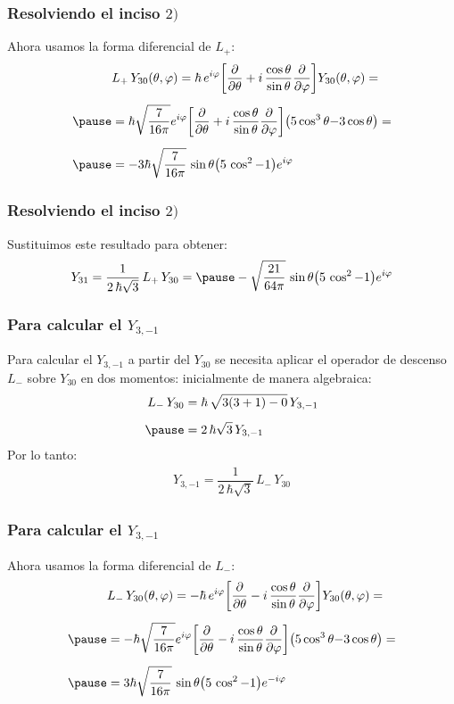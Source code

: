 \documentclass[12pt]{beamer}
\begin{document}
\begin{frame}
\frametitle{Resolviendo el inciso $2)$}
Ahora usamos la forma diferencial de $L_{+}$:
\pause
\begin{eqnarray*}
\begin{aligned}
&L_{+} \, Y_{30} (\theta, \varphi) = \hbar \, e^{i \varphi} \bigg[ \pdv{\theta} + i \, \dfrac{\cos \theta}{\sin \theta} \pdv{\varphi} \bigg] Y_{30} (\theta, \varphi) = \\[0.5em] \pause
&= \hbar \sqrt{\dfrac{7}{16 \pi}} e^{i \varphi} \bigg[ \pdv{\theta} + i \, \dfrac{\cos \theta}{\sin \theta} \pdv{\varphi} \bigg] \big( 5 \cos^{3} \theta {-} 3 \cos \theta \big) = \\[0.5em] \pause 
&= - 3 \hbar \sqrt{\dfrac{7}{16 \pi}} \, \sin \theta \big( 5 \, \cos^{2} - 1 \big) e^{i \varphi}
\end{aligned}
\end{eqnarray*}
\end{frame}
\begin{frame}
\frametitle{Resolviendo el inciso $2)$}
Sustituimos este resultado para obtener:
\pause
\begin{eqnarray*}
Y_{31} = \dfrac{1}{2 \, \hbar \sqrt{3}} \, L_{+} \, Y_{30} = \pause - \sqrt{\dfrac{21}{64 \pi}} \, \sin \theta \big( 5 \, \cos^{2} - 1 \big) e^{i \varphi}
\end{eqnarray*}
\end{frame}
\begin{frame}
\frametitle{Para calcular el $Y_{3,-1}$}
Para calcular el $Y_{3,-1}$ a partir del $Y_{30}$ \pause se necesita aplicar el operador de descenso $L_{-}$ sobre $Y_{30}$ en dos momentos: \pause inicialmente de manera algebraica:
\pause
\begin{eqnarray*}
\begin{aligned}
L_{-} \, Y_{30} &= \hbar \, \sqrt{3 (3 + 1)- 0} \, Y_{3,-1} \\[0.5em] \pause
&= 2 \, \hbar \sqrt{3} \, Y_{3,-1}
\end{aligned}
\end{eqnarray*}
\pause
Por lo tanto:
\pause
\begin{align*}
Y_{3,-1} = \dfrac{1}{2 \, \hbar \sqrt{3}} \, L_{-} \, Y_{30}
\end{align*}
\end{frame}
\begin{frame}
\frametitle{Para calcular el $Y_{3,-1}$}
Ahora usamos la forma diferencial de $L_{-}$:
\pause
\begin{eqnarray*}
\begin{aligned}
&L_{-} \, Y_{30} (\theta, \varphi) = - \hbar \, e^{i \varphi} \bigg[ \pdv{\theta} - i \, \dfrac{\cos \theta}{\sin \theta} \pdv{\varphi} \bigg] Y_{30} (\theta, \varphi) = \\[0.5em] \pause
&= - \hbar \sqrt{\dfrac{7}{16 \pi}} e^{i \varphi} \bigg[ \pdv{\theta} - i \, \dfrac{\cos \theta}{\sin \theta} \pdv{\varphi} \bigg] \big( 5 \cos^{3} \theta {-} 3 \cos \theta \big) = \\[0.5em] \pause 
&= 3\hbar \sqrt{\dfrac{7}{16 \pi}} \, \sin \theta \big( 5 \, \cos^{2} - 1 \big) e^{-i \varphi}
\end{aligned}
\end{eqnarray*}
\end{frame}
\end{document}
